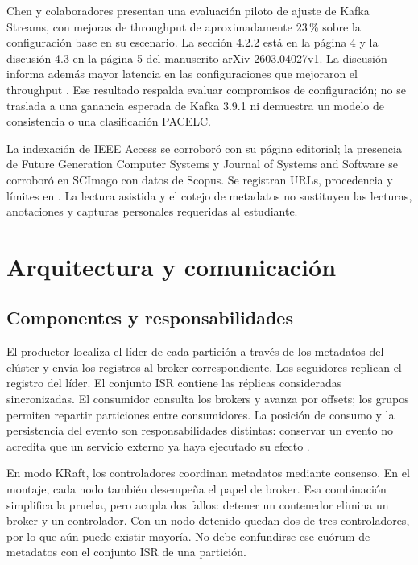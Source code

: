 \documentclass[11pt,a4paper]{article}
\begin{document}
Chen y colaboradores presentan una evaluación piloto de ajuste de Kafka Streams, con mejoras de throughput de aproximadamente 23\,\% sobre la configuración base en su escenario. La sección 4.2.2 está en la página 4 y la discusión 4.3 en la página 5 del manuscrito arXiv 2603.04027v1. La discusión informa además mayor latencia en las configuraciones que mejoraron el throughput \cite{chen2026tuning}. Ese resultado respalda evaluar compromisos de configuración; no se traslada a una ganancia esperada de Kafka 3.9.1 ni demuestra un modelo de consistencia o una clasificación PACELC.

La indexación de IEEE Access se corroboró con su página editorial; la presencia de Future Generation Computer Systems y Journal of Systems and Software se corroboró en SCImago con datos de Scopus. Se registran URLs, procedencia y límites en . La lectura asistida y el cotejo de metadatos no sustituyen las lecturas, anotaciones y capturas personales requeridas al estudiante.

\section{Arquitectura y comunicación}
\subsection{Componentes y responsabilidades}
El productor localiza el líder de cada partición a través de los metadatos del clúster y envía los registros al broker correspondiente. Los seguidores replican el registro del líder. El conjunto ISR contiene las réplicas consideradas sincronizadas. El consumidor consulta los brokers y avanza por offsets; los grupos permiten repartir particiones entre consumidores. La posición de consumo y la persistencia del evento son responsabilidades distintas: conservar un evento no acredita que un servicio externo ya haya ejecutado su efecto \cite{kafka391design}.

En modo KRaft, los controladores coordinan metadatos mediante consenso. En el montaje, cada nodo también desempeña el papel de broker. Esa combinación simplifica la prueba, pero acopla dos fallos: detener un contenedor elimina un broker y un controlador. Con un nodo detenido quedan dos de tres controladores, por lo que aún puede existir mayoría. No debe confundirse ese cuórum de metadatos con el conjunto ISR de una partición.
\end{document}
